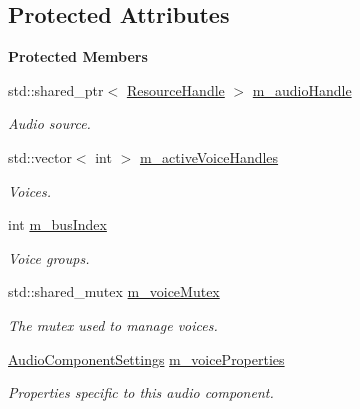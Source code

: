\subsection*{Protected Attributes}
\begin{Indent}\textbf{ Protected Members}\par
\begin{DoxyCompactItemize}
\item 
std\+::shared\+\_\+ptr$<$ \mbox{\hyperlink{classrev_1_1_resource_handle}{Resource\+Handle}} $>$ \mbox{\hyperlink{classrev_1_1_audio_source_component_a908a35cf39a4e7b7dd096ead05aad22d}{m\+\_\+audio\+Handle}}
\begin{DoxyCompactList}\small\item\em Audio source. \end{DoxyCompactList}\item 
std\+::vector$<$ int $>$ \mbox{\hyperlink{classrev_1_1_audio_source_component_a81e3ba07e63f3b54f907361d813e532b}{m\+\_\+active\+Voice\+Handles}}
\begin{DoxyCompactList}\small\item\em Voices. \end{DoxyCompactList}\item 
int \mbox{\hyperlink{classrev_1_1_audio_source_component_aff77615a5b500bfc8efeb1d82ca7f923}{m\+\_\+bus\+Index}}
\begin{DoxyCompactList}\small\item\em Voice groups. \end{DoxyCompactList}\item 
\mbox{\label{classrev_1_1_audio_source_component_ae3a688fa92edb0cdb9325110d63d9b0e}} 
std\+::shared\+\_\+mutex \mbox{\hyperlink{classrev_1_1_audio_source_component_ae3a688fa92edb0cdb9325110d63d9b0e}{m\+\_\+voice\+Mutex}}
\begin{DoxyCompactList}\small\item\em The mutex used to manage voices. \end{DoxyCompactList}\item 
\mbox{\label{classrev_1_1_audio_source_component_a05bdfe5c62a0a7f4515ff8b01f51ed6d}} 
\mbox{\hyperlink{structrev_1_1_audio_component_settings}{Audio\+Component\+Settings}} \mbox{\hyperlink{classrev_1_1_audio_source_component_a05bdfe5c62a0a7f4515ff8b01f51ed6d}{m\+\_\+voice\+Properties}}
\begin{DoxyCompactList}\small\item\em Properties specific to this audio component. \end{DoxyCompactList}\end{DoxyCompactItemize}
\end{Indent}
